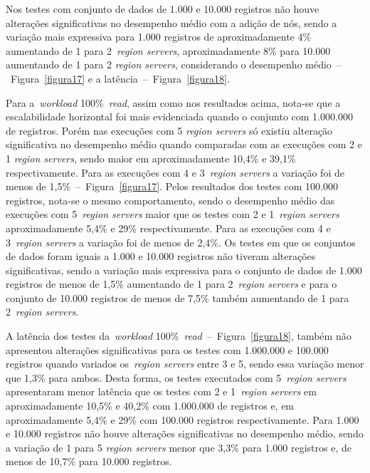 \documentclass[12pt]{article}
\begin{document}
Nos testes com conjunto de dados de 1.000 e 10.000 registros não houve alterações significativas no desempenho médio com a adição de nós, sendo a variação mais expressiva para 1.000 registros de aproximadamente 4\% aumentando de 1 para 2~\emph{region servers}, aproximadamente 8\% para 10.000 aumentando de 1 para 2 \emph{region servers}, considerando o desempenho médio~--~Figura~\ref{figura17} e a latência~--~Figura~\ref{figura18}.

Para a~\emph{workload} 100\%~\emph{read}, assim como nos resultados acima, nota-se que a escalabilidade horizontal foi mais evidenciada quando o conjunto com 1.000.000 de registros. Porém nas execuções com 5 \emph{region servers} só existiu alteração significativa no desempenho médio quando comparadas com as execuções com 2 e 1 \emph{region servers}, sendo maior em aproximadamente 10,4\% e 39,1\% respectivamente. Para as execuções com 4 e 3~\emph{region servers} a variação foi de menos de 1,5\%~--~Figura~\ref{figura17}. Pelos resultados dos testes com 100.000 registros, nota-se o mesmo comportamento, sendo o desempenho médio das execuções com 5~\emph{region servers} maior que os testes com 2 e 1~\emph{region servers} aproximadamente 5,4\% e 29\% respectivamente. 
Para as execuções com 4 e 3~\emph{region servers} a variação foi de menos de 2,4\%. Os testes em que os conjuntos de dados foram iguais a 1.000 e 10.000 registros não tiveram alterações significativas, sendo a variação mais expressiva para o conjunto de dados de 1.000 registros de menos de 1,5\% aumentando de 1 para 2~\emph{region servers} e para o conjunto de 10.000 registros de menos de 7,5\% também aumentando de 1 para 2~\emph{region servers}.

A latência dos testes da~\emph{workload} 100\%~\emph{read}~--~Figura~\ref{figura18}, também não apresentou alterações significativas para os testes com 1.000.000 e 100.000 registros quando variados os~\emph{region servers} entre 3 e 5, sendo essa variação menor que 1,3\% para ambos. 
Desta forma, os testes executados com 5~\emph{region servers} apresentaram menor latência que os testes com 2 e 1~\emph{region servers} em aproximadamente 10,5\% e 40,2\% com 1.000.000 de registros e, em aproximadamente 5,4\% e 29\% com 100.000 registros respectivamente. Para 1.000 e 10.000 registros não houve alterações significativas no desempenho médio, sendo a variação de 1 para 5 \emph{region servers} menor que 3,3\% para 1.000 registros e, de menos de 10,7\% para 10.000 registros.
\end{document}
